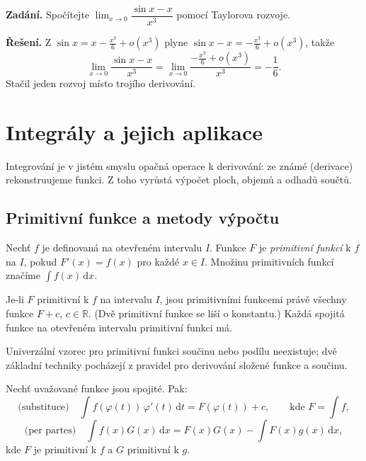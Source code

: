 \documentclass[11pt,a4paper]{article}
\begin{document}
\begin{priklad}
\textbf{Zadání.} Spočítejte $\lim_{x\to0}\dfrac{\sin x-x}{x^3}$ pomocí Taylorova rozvoje.\par
\textbf{Řešení.} Z $\sin x=x-\tfrac{x^3}{6}+o(x^3)$ plyne $\sin x-x=-\tfrac{x^3}{6}+o(x^3)$, takže
\[
  \lim_{x\to0}\frac{\sin x-x}{x^3}=\lim_{x\to0}\frac{-\tfrac{x^3}{6}+o(x^3)}{x^3}=-\frac16.
\]
Stačil jeden rozvoj místo trojího derivování.
\end{priklad}


\section{Integrály a jejich aplikace}

Integrování je v jistém smyslu opačná operace k derivování: ze známé  (derivace) rekonstruujeme funkci. Z toho vyrůstá výpočet ploch, objemů a odhadů součtů.

\subsection{Primitivní funkce a metody výpočtu}

\begin{definice}
Nechť $f$ je definovaná na otevřeném intervalu $I$. Funkce $F$ je \emph{primitivní funkcí} k $f$ na $I$, pokud $F'(x)=f(x)$ pro každé $x\in I$. Množinu primitivních funkcí značíme $\int f(x)\,\mathrm{d}x$.
\end{definice}

\begin{veta}
Je-li $F$ primitivní k $f$ na intervalu $I$, jsou primitivními funkcemi právě všechny funkce $F+c$, $c\in\mathbb{R}$. (Dvě primitivní funkce se liší o konstantu.) Každá spojitá funkce na otevřeném intervalu primitivní funkci má.
\end{veta}

Univerzální vzorec pro primitivní funkci součinu nebo podílu neexistuje; dvě základní techniky pocházejí z pravidel pro derivování složené funkce a součinu.

\begin{veta}
Nechť uvažované funkce jsou spojité. Pak:
\[
  \text{(substituce)}\quad \int f(\varphi(t))\,\varphi'(t)\,\mathrm{d}t=F(\varphi(t))+c,\qquad\text{kde } F=\int f,
\]
\[
  \text{(per partes)}\quad \int f(x)G(x)\,\mathrm{d}x=F(x)G(x)-\int F(x)g(x)\,\mathrm{d}x,
\]
kde $F$ je primitivní k $f$ a $G$ primitivní k $g$.
\end{veta}
\end{document}
